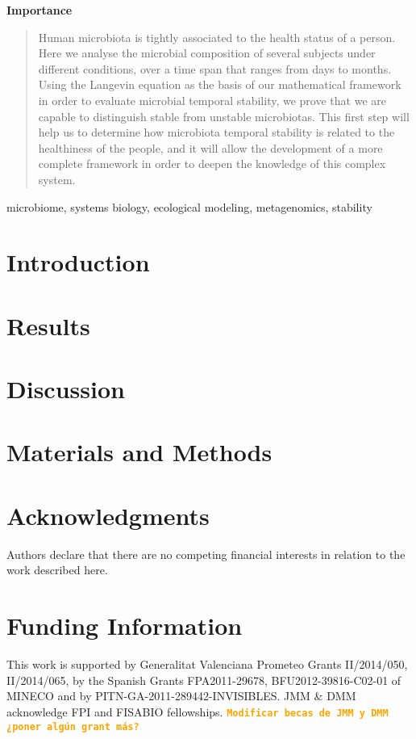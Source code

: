 \documentclass[12pt,oneside,letterpaper]{article}
\newcommand\importancename{Importance}
\newcommand{\importance}[1]{
	{
    \small
    \begin{center}
        {\bfseries \importancename\vspace{-.5em}\vspace{0pt}}
    \end{center}
    \begin{quote}
    #1
    \end{quote}
    }
}
\newcommand{\todo}[1]{\texttt{\bfseries\textcolor{Orange}{#1}}}
\begin{document}
\importance{Human microbiota is tightly associated to the health status of a person. Here we analyse the microbial composition of several subjects under different conditions, over a time span that ranges from days to months. Using the Langevin equation as the basis of our mathematical framework in order to evaluate microbial temporal stability, we prove that we are capable to distinguish stable from unstable microbiotas. This first step will help us to determine how microbiota temporal stability is related to the healthiness of the people, and it will allow the development of a more complete framework in order to deepen the knowledge of this complex system.}

\vspace{4mm}
\begin{keywords}
microbiome, systems biology, ecological modeling, metagenomics, stability	
\end{keywords}

\section*{Introduction}

\clearpage
\section*{Results}

\clearpage
\section*{Discussion}

\clearpage    
\section*{Materials and Methods}
   
\clearpage

\section*{Acknowledgments}
Authors declare that there are no competing financial interests in relation to the work described here. 

\section*{Funding Information}
This work is supported by Generalitat Valenciana Prometeo Grants II/2014/050, II/2014/065, by the Spanish Grants FPA2011-29678, BFU2012-39816-C02-01 of MINECO and by PITN-GA-2011-289442-INVISIBLES. JMM \& DMM acknowledge FPI and FISABIO fellowships. \todo{Modificar becas de JMM y DMM ¿poner algún grant más?}
\end{document}
